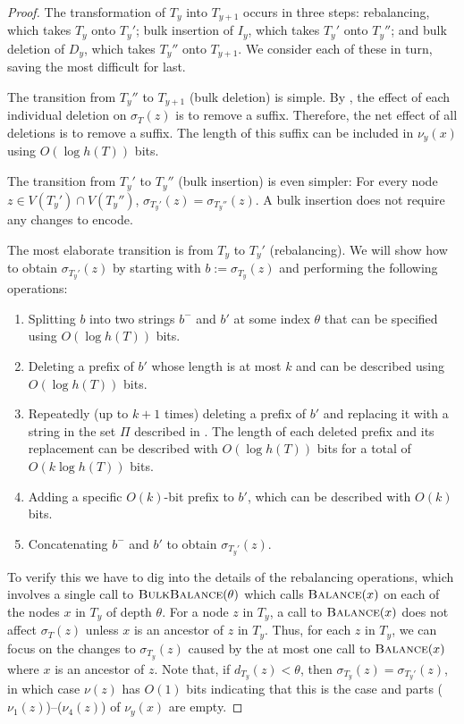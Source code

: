 \documentclass[kpfonts]{patmorin}
\begin{document}
\begin{proof}
  The transformation of $T_{y}$ into $T_{y+1}$ occurs in three steps: rebalancing, which takes $T_y$ onto $T_y'$; bulk insertion of $I_y$, which takes $T_y'$ onto $T_y''$; and bulk deletion of $D_y$, which takes $T_y''$ onto $T_{y+1}$.  We consider each of these in turn, saving the most difficult for last.
  
  The transition from $T_y''$ to $T_{y+1}$ (bulk deletion) is simple.  By , the effect of each individual deletion on $\sigma_T(z)$ is to remove a suffix.  Therefore, the net effect of all deletions is to remove a suffix.  The length of this suffix can be included in $\nu_y(x)$ using $O(\log h(T))$ bits.
  
  The transition from $T_y'$ to $T_y''$ (bulk insertion) is even simpler: For every node $z\in V(T_y')\cap V(T_y'')$, $\sigma_{T_y'}(z)=\sigma_{T_y''}(z)$.  A bulk insertion does not require any changes to encode.
  
  The most elaborate transition is from $T_y$ to $T_y'$ (rebalancing).  We will show how to obtain $\sigma_{T_y'}(z)$ by starting with $b:=\sigma_{T_y}(z)$ and performing the following operations:
  \begin{enumerate}[($\nu_1$)]
    \item Splitting $b$ into two strings $b^-$ and $b'$ at some index $\theta$ that can be specified using $O(\log h(T))$ bits.
    \item Deleting a prefix of $b'$ whose length is at most $k$ and can be described using $O(\log h(T))$ bits.
    \item Repeatedly (up to $k+1$ times) deleting a prefix of $b'$ and replacing it with a string in the set $\Pi$ described in .  The length of each deleted prefix and its replacement can be described with $O(\log h(T))$ bits for a total of $O(k\log h(T))$ bits.
    \item Adding a specific $O(k)$-bit prefix to $b'$, which can be described with $O(k)$ bits.
    \item Concatenating $b^-$ and $b'$ to obtain $\sigma_{T_y'}(z)$.
  \end{enumerate}
  To verify this we have to dig into the details of the rebalancing operations, which involves a single call to $\textsc{BulkBalance}(\theta)$ which calls $\textsc{Balance}(x)$ on each of the nodes $x$ in $T_y$ of depth $\theta$.    
  For a node $z$ in $T_y$, a call to $\textsc{Balance}(x)$ does not affect $\sigma_T(z)$ unless $x$ is an ancestor of $z$ in $T_y$.  Thus, for each $z$ in $T_y$, we can focus on the changes to $\sigma_{T_y}(z)$ caused by the at most one call to $\textsc{Balance}(x)$ where $x$ is an ancestor of $z$. Note that, if $d_{T_y}(z)<\theta$, then $\sigma_{T_y}(z)=\sigma_{T_y'}(z)$, in which case $\nu(z)$ has $O(1)$ bits indicating that this is the case and parts ($\nu_1(z)$)--($\nu_4(z)$) of $\nu_y(x)$ are empty.
  

\end{proof}
\end{document}

